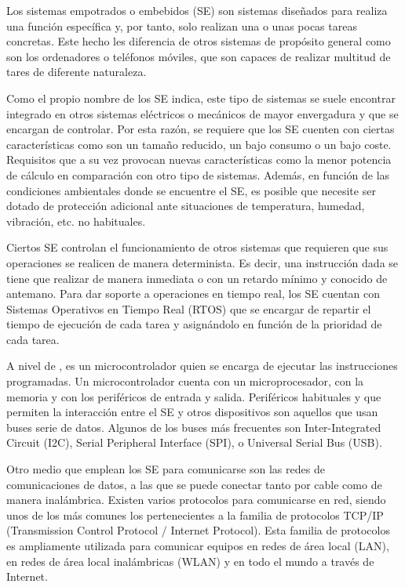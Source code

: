 \label{ch:introduccion}
Los sistemas empotrados o embebidos (SE) son sistemas diseñados para realiza una
función específica y, por tanto, solo realizan una o unas pocas tareas
concretas. Este hecho les diferencia de otros sistemas de propósito general como
son los ordenadores o teléfonos móviles, que son capaces de realizar multitud de
tares de diferente naturaleza. 

Como el propio nombre de los SE indica, este tipo de sistemas se suele encontrar
integrado en otros sistemas eléctricos o mecánicos de mayor envergadura y que se
encargan de controlar. Por esta razón, se requiere que los SE cuenten con 
ciertas características como son un tamaño reducido, un bajo consumo o un bajo
coste. Requisitos que a su vez provocan nuevas características como la menor
potencia de cálculo en comparación con otro tipo de sistemas. Además, en función
de las condiciones ambientales donde se encuentre el SE, es posible que necesite
ser dotado de protección adicional ante situaciones de temperatura, humedad,
vibración, etc. no habituales.

Ciertos SE controlan el funcionamiento de otros sistemas que requieren que sus
operaciones se realicen de manera determinista. Es decir, una instrucción dada
se tiene que realizar de manera inmediata o con un retardo mínimo y conocido de
antemano. Para dar soporte a operaciones en tiempo real, los SE cuentan con
Sistemas Operativos en Tiempo Real (RTOS) que se encargar de repartir el tiempo
de ejecución de cada tarea y asignándolo en función de la prioridad de cada
tarea.

A nivel de , es un microcontrolador quien se encarga de
ejecutar las instrucciones programadas. Un microcontrolador cuenta con un
microprocesador, con la memoria y con los periféricos de entrada y salida.
Periféricos habituales y que permiten la interacción entre el SE y otros
dispositivos son aquellos que usan buses serie de datos. Algunos de los buses
más frecuentes son Inter-Integrated Circuit (I2C), Serial Peripheral Interface
(SPI), o Universal Serial Bus (USB).

Otro medio que emplean los SE para comunicarse son las redes de comunicaciones
de datos, a las que se puede conectar tanto por cable como de manera
inalámbrica. Existen varios protocolos para comunicarse en red, siendo unos de
los más comunes los pertenecientes a la familia de protocolos TCP/IP
(Transmission Control Protocol / Internet Protocol). Esta familia de protocolos
es ampliamente utilizada para comunicar equipos en redes de área local (LAN), en
redes de área local inalámbricas (WLAN) y en todo el mundo a través de Internet.

